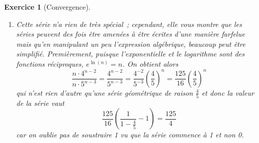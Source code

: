 \documentclass[11.5pt,french,table]{article}
\theoremstyle{exercice}
\newtheorem{exercice}{Exercice}
\begin{document}
\begin{exercice}[Convergence]
\begin{enumerate}
    \[
    \begin{array}{|c|c|c|} \hline %
    \neg P & \neg Q & \neg Q \implies \neg P\\ \hline
    F & F & V\\
    F & V & F\\
    V & F & V\\
    V & V & V\\
    \hline
    \end{array} %
    \]
    On remarque que les colonnes de droite des 2 tableaux sont les mêmes. On dit alors que les expressions sont \emph{équivalentes}, car elles ont les mêmes valeurs de vérité. Ainsi, on peut reformuler notre implication en termes de la contraposée, en restant mathématiquement valable.

    Maintenant qu'on a prouvé ça, on peut aller au concret. La limite $\displaystyle\lim_{n \to \infty} \frac{n^3 + 4}{n^3 + 2}$ peut être déduite par la proposition sur les limites des quotients de polynômes. En effet, étant donné que les 2 polynômes en haut et en bas sont du même degré, la limite s'obtient avec le quotient des coefficients devant les termes ayant le plus haut degré, donc ici $\frac{1}{1} = 1$. Puisque la limite du terme général n'est pas 0, la série diverge donc.
    
    \item Cette série n'a rien de très spécial~; cependant, elle vous montre que les séries peuvent des fois être amenées à être écrites d'une manière farfelue mais qu'en manipulant un peu l'expression algébrique, beaucoup peut être simplifié. Premièrement, puisque l'exponentielle et le logarithme sont des fonctions réciproques, $e^{\ln(n)} = n$. On obtient alors
    \[
    \frac{n\cdot 4^{n-2}}{n\cdot 5^{n-3}} = \frac{4^{n-2}}{5^{n-3}} = \frac{4^{-2}}{5^{-3}}\left(\frac{4}{5}\right)^n = \frac{125}{16} \left(\frac{4}{5}\right)^n
    \]
    qui n'est rien d'autre qu'une série géométrique de raison $\frac{4}{5}$ et donc la valeur de la série vaut
    \[
    \frac{125}{16}\left(\frac{1}{1 - \frac{4}{5}} - 1\right) = \frac{125}{4}
    \]
    car on oublie pas de soustraire 1 vu que la série commence à 1 et non 0.
\end{enumerate}
\end{exercice}
\end{document}
